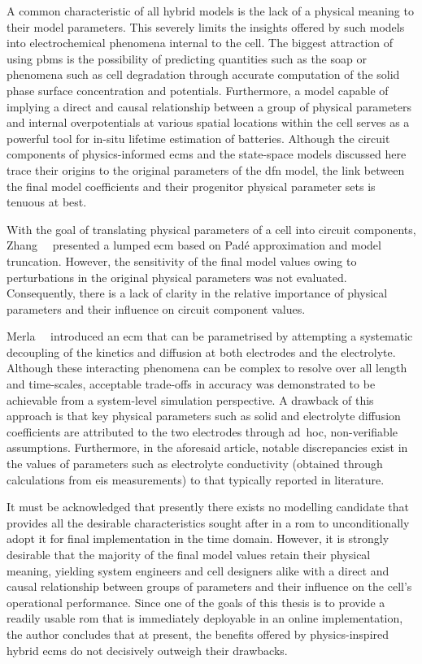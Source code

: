 A  common  characteristic  of all  hybrid  models  is  the  lack of  a  physical
meaning to  their model  parameters. This severely  limits the  insights offered
by  such  models  into  electrochemical  phenomena internal  to  the  cell.  The
biggest  attraction  of  using  \glspl{pbm} is  the  possibility  of  predicting
quantities such as the \gls{soap} or  phenomena such as cell degradation through
accurate computation  of the solid  phase surface concentration  and potentials.
Furthermore,  a model  capable  of  implying a  direct  and causal  relationship
between a  group of physical  parameters and internal overpotentials  at various
spatial locations within the cell serves as a powerful tool for in-situ lifetime
estimation  of batteries.  Although the  circuit components  of physics-informed
\glspl{ecm} and the state-space models discussed here trace their origins to the
original parameters  of the \gls{dfn}  model, the  link between the  final model
coefficients and their progenitor physical parameter sets is tenuous at best.


With  the  goal of  translating  physical  parameters  of  a cell  into  circuit
components, Zhang~\etal{}~\cite{Zhang2017} presented a lumped \gls{ecm} based on
Padé approximation and  model truncation. However, the sensitivity  of the final
model values owing to perturbations in  the original physical parameters was not
evaluated. Consequently, there  is a lack of clarity in  the relative importance
of physical parameters and their influence on circuit component values.


Merla~\etal{}~\cite{Merla2018} introduced an \gls{ecm}  that can be parametrised
by attempting  a systematic  decoupling of  the kinetics  and diffusion  at both
electrodes  and the  electrolyte. Although  these interacting  phenomena can  be
complex to  resolve over  all length and  time-scales, acceptable  trade-offs in
accuracy  was  demonstrated to  be  achievable  from a  system-level  simulation
perspective. A  drawback of this approach  is that key physical  parameters such
as  solid and  electrolyte  diffusion  coefficients are  attributed  to the  two
electrodes  through  \mbox{ad hoc},  non-verifiable assumptions.  Furthermore,
in  the aforesaid article, notable discrepancies exist  in the values of
parameters such as  electrolyte  conductivity  (obtained  through  calculations
from  \gls{eis} measurements) to that typically reported in literature.

It must be acknowledged that presently  there exists no modelling candidate that
provides  all the  desirable  characteristics  sought after  in  a \gls{rom}  to
unconditionally adopt it  for final implementation in the  time domain. However,
it is  strongly desirable  that the  majority of the  final model  values retain
their physical meaning, yielding system  engineers and cell designers alike with
a  direct  and  causal  relationship  between groups  of  parameters  and  their
influence on the cell's operational performance.  Since one of the goals of this
thesis is to  provide a readily usable \gls{rom} that  is immediately deployable
in an online implementation, the author  concludes that at present, the benefits
offered by physics-inspired hybrid \glspl{ecm}  do not decisively outweigh their
drawbacks.

